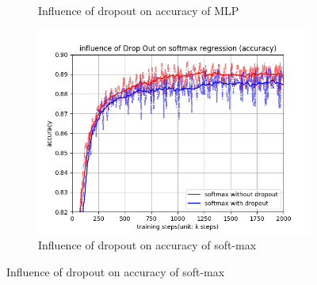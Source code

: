 \documentclass[12pt,letterpaper]{article}
\begin{document}
\begin{figure}[h]
\begin{subfigure}{0.32\textwidth}
    \caption{\small Influence of dropout on accuracy of MLP} \label{fig:b}
    \end{subfigure}
    \begin{subfigure}{0.32\textwidth}
    \includegraphics[width=\linewidth]{softmax_dropout_acc.png}
    \caption{\small Influence of dropout on accuracy of soft-max} \label{fig:b}
    \end{subfigure}
    

\end{figure}
\end{document}
